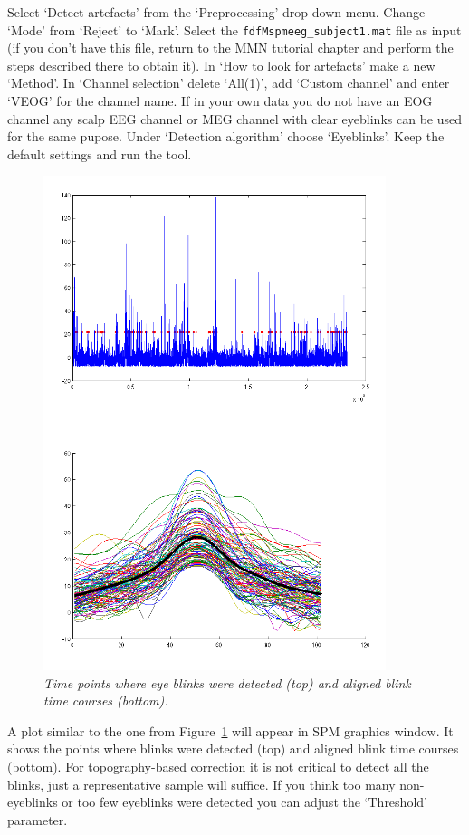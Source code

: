 Select `Detect artefacts' from the `Preprocessing' drop-down menu. Change `Mode' from `Reject' to `Mark'. Select the \texttt{fdfMspmeeg\_subject1.mat} file as input (if you don't have this file, return to the MMN tutorial chapter and perform the steps described there to obtain it). In `How to look for artefacts' make a new `Method'. In `Channel selection' delete `All(1)', add `Custom channel' and enter `VEOG' for the channel name. If in your own data you do not have an EOG channel any scalp EEG channel or MEG channel with clear eyeblinks can be used for the same pupose. Under `Detection algorithm' choose `Eyeblinks'. Keep the default settings and run the tool. 

\begin{figure}
\begin{center}
\includegraphics[width=100mm]{meeg_artefact/figure2}
\caption{\em Time points where eye blinks were detected (top) and aligned blink time courses (bottom). \label{artefact_fig2}}
\end{center}
\end{figure}
 
A plot similar to the one from Figure~\ref{artefact_fig2} will appear in SPM graphics window. It shows the points where blinks were detected (top) and aligned blink time courses (bottom). For topography-based correction it is not critical to detect all the blinks, just a representative sample will suffice. If you think too many non-eyeblinks or too few eyeblinks were detected you can adjust the `Threshold' parameter. 

